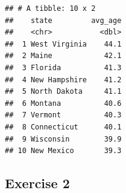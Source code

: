 \documentclass[
]{book}
\newenvironment{Shaded}{\begin{snugshade}}{\end{snugshade}}
\newcommand{\ControlFlowTok}[1]{\textcolor[rgb]{0.13,0.29,0.53}{\textbf{#1}}}
\newcommand{\KeywordTok}[1]{\textcolor[rgb]{0.13,0.29,0.53}{\textbf{#1}}}
\newcommand{\NormalTok}[1]{#1}
\newcommand{\OperatorTok}[1]{\textcolor[rgb]{0.81,0.36,0.00}{\textbf{#1}}}
\newcommand{\StringTok}[1]{\textcolor[rgb]{0.31,0.60,0.02}{#1}}
\theoremstyle{definition}
\theoremstyle{definition}
\theoremstyle{definition}
\theoremstyle{definition}
\theoremstyle{remark}
\begin{document}
\begin{verbatim}
## # A tibble: 10 x 2
##    state         avg_age
##    <chr>           <dbl>
##  1 West Virginia    44.1
##  2 Maine            42.1
##  3 Florida          41.3
##  4 New Hampshire    41.2
##  5 North Dakota     41.1
##  6 Montana          40.6
##  7 Vermont          40.3
##  8 Connecticut      40.1
##  9 Wisconsin        39.9
## 10 New Mexico       39.3
\end{verbatim}

\hypertarget{exercise-2}{%
\subsection*{Exercise 2}\label{exercise-2}}

\begin{Shaded}
\end{Shaded}
\end{document}
